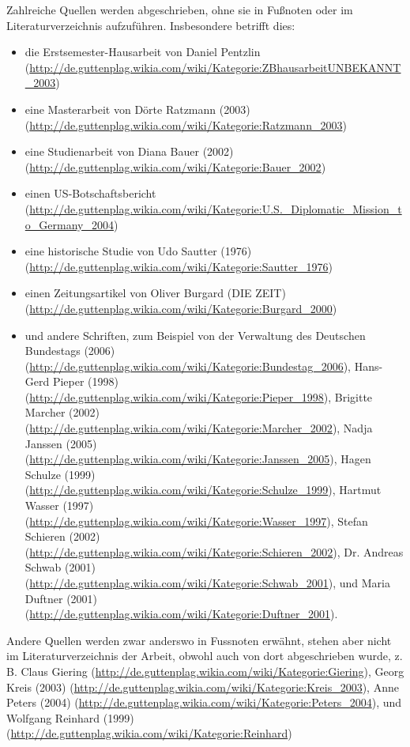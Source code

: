 \documentclass[ngerman,final,fontsize=12pt,paper=a4,twoside,BCOR=8mm,draft=false]{scrartcl}
\begin{document}
Zahlreiche Quellen werden abgeschrieben, ohne sie in Fußnoten oder im Literaturverzeichnis aufzuführen. Insbesondere betrifft dies:
\begin{itemize}

\item die Erstsemester-Hausarbeit von Daniel Pentzlin (\url{http://de.guttenplag.wikia.com/wiki/Kategorie:ZBhausarbeitUNBEKANNT\_2003})
\item eine Masterarbeit von Dörte Ratzmann (2003) (\url{http://de.guttenplag.wikia.com/wiki/Kategorie:Ratzmann\_2003})
\item eine Studienarbeit von Diana Bauer (2002) (\url{http://de.guttenplag.wikia.com/wiki/Kategorie:Bauer\_2002})
\item einen US-Botschaftsbericht (\url{http://de.guttenplag.wikia.com/wiki/Kategorie:U.S.\_Diplomatic\_Mission\_to\_Germany\_2004})
\item eine historische Studie von Udo Sautter (1976) (\url{http://de.guttenplag.wikia.com/wiki/Kategorie:Sautter\_1976})
\item einen Zeitungsartikel von Oliver Burgard (DIE ZEIT) (\url{http://de.guttenplag.wikia.com/wiki/Kategorie:Burgard\_2000})

\item und andere Schriften, zum Beispiel von der Verwaltung des
  Deutschen Bundestags (2006)
  (\url{http://de.guttenplag.wikia.com/wiki/Kategorie:Bundestag\_2006}),
    Hans-Gerd Pieper (1998)
    (\url{http://de.guttenplag.wikia.com/wiki/Kategorie:Pieper\_1998}),
    Brigitte Marcher (2002)
    (\url{http://de.guttenplag.wikia.com/wiki/Kategorie:Marcher\_2002}),
    Nadja Janssen (2005)
    (\url{http://de.guttenplag.wikia.com/wiki/Kategorie:Janssen\_2005}),
    Hagen Schulze (1999)
    (\url{http://de.guttenplag.wikia.com/wiki/Kategorie:Schulze\_1999}),
    Hartmut Wasser (1997)
    (\url{http://de.guttenplag.wikia.com/wiki/Kategorie:Wasser\_1997}),
    Stefan Schieren (2002)
    (\url{http://de.guttenplag.wikia.com/wiki/Kategorie:Schieren\_2002}),
    Dr. Andreas Schwab (2001)
    (\url{http://de.guttenplag.wikia.com/wiki/Kategorie:Schwab\_2001}), und
    Maria Duftner (2001)
    (\url{http://de.guttenplag.wikia.com/wiki/Kategorie:Duftner\_2001}).
\end{itemize}
Andere Quellen werden zwar anderswo in Fussnoten erwähnt, stehen aber
nicht im Literaturverzeichnis der Arbeit, obwohl auch von dort
abgeschrieben wurde, z. B. Claus Giering
(\url{http://de.guttenplag.wikia.com/wiki/Kategorie:Giering}), Georg
  Kreis (2003)
  (\url{http://de.guttenplag.wikia.com/wiki/Kategorie:Kreis\_2003}), Anne
  Peters (2004)
  (\url{http://de.guttenplag.wikia.com/wiki/Kategorie:Peters\_2004}), und
  Wolfgang Reinhard (1999)
  (\url{http://de.guttenplag.wikia.com/wiki/Kategorie:Reinhard})
\end{document}
